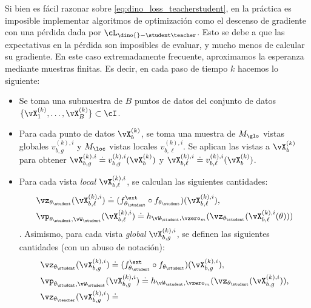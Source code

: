 \documentclass[../../book-main_es.tex]{subfiles}
\begin{document}
Si bien es fácil razonar sobre \eqref{eq:dino_loss_teacherstudent},
en la práctica es imposible implementar algoritmos de optimización
como el descenso de gradiente con una pérdida dada por
\(\cL_{\dino{}-\student\teacher}\). Esto se debe a que las expectativas
en la pérdida son imposibles de evaluar, y mucho menos de calcular
su gradiente. En este caso extremadamente frecuente, aproximamos la
esperanza mediante muestras finitas. Es decir, en cada paso de tiempo \(k\) hacemos lo siguiente:
\begin{itemize}
    \item Se toma una submuestra de \(B\) puntos de datos del conjunto de datos
        \(\{\vX_{1}^{(k)}, \dots, \vX_{B}^{(k)}\} \subset \cI\).
    \item Para cada punto de datos \(\vX_{b}^{(k)}\), se toma una muestra de \(M_{\glo}\)
        vistas globales \(v_{b, g}^{(k), i}\) y \(M_{\loc}\) vistas
        locales \(v_{b, \ell}^{(k), i}\). Se aplican las vistas a
        \(\vX_{b}^{(k)}\) para obtener \(\vX_{b, g}^{(k), i} \doteq
        v_{b, g}^{(k), i}(\vX_{b}^{(k)})\) y \(\vX_{b, \ell}^{(k),
        i} \doteq v_{b, \ell}^{(k), i}(\vX_{b}^{(k)})\).
    \item Para cada vista \textit{local} \(\vX_{b, \ell}^{(k), i}\),
        se calculan las siguientes cantidades:
        \begin{align}
            &\vz_{\theta_{\student}}(\vX_{b, \ell}^{(k), i}) \doteq
            (f_{\theta_{\student}}^{\ext} \circ
            f_{\theta_{\student}})(\vX_{b, \ell}^{(k), i}), \\
            &\vp_{\theta_{\student}, \vW_{\student}}(\vX_{b,
            \ell}^{(k), i}) \doteq h_{\vW_{\student},
            \vzero_{m}}(\vz_{\theta_{\student}}(\vX_{b, \ell}^{(k), i}(\theta)))
        \end{align}.
        Asimismo, para cada vista \textit{global} \(\vX_{b, g}^{(k), i}\),
        se definen las siguientes cantidades (con un abuso de notación):
        \begin{align}
            &\vz_{\theta_{\student}}(\vX_{b, g}^{(k), i}) \doteq
            (f_{\theta_{\student}}^{\ext} \circ
            f_{\theta_{\student}})(\vX_{b, g}^{(k), i}), \\
            &\vp_{\theta_{\student}, \vW_{\student}}(\vX_{b, g}^{(k),
            i}) \doteq h_{\vW_{\student},
            \vzero_{m}}(\vz_{\theta_{\student}}(\vX_{b, g}^{(k), i})), \\
            &\vz_{\theta_{\teacher}}(\vX_{b, g}^{(k), i}) \doteq

\end{align}
\end{itemize}
\end{document}
